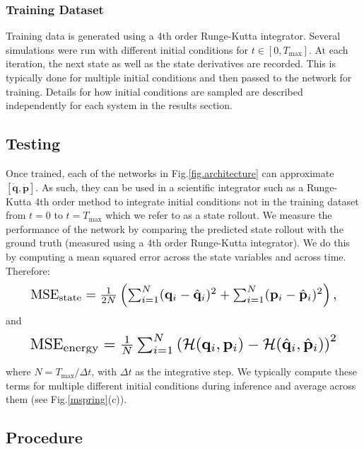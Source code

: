\documentclass{article}
\begin{document}
\subsubsection{Training Dataset}

Training data is generated using a 4th order Runge-Kutta integrator. Several simulations were run with different initial conditions for $t\in [0,T_{\max}]$. At each iteration, the next state as well as the state derivatives are recorded. This is typically done for multiple initial conditions and then passed to the network for training. Details for how initial conditions are sampled are described independently for each system in the results section.

\subsection{Testing}
Once trained, each of the networks in Fig.\ref{fig.architecture} can approximate $[\dot{\mathbf{q}},\dot{\mathbf{p}}]$. As such, they can be used in a scientific integrator such as a Runge-Kutta 4th order method to integrate initial conditions not in the training dataset from $t=0$ to $t=T_{\max}$ which we refer to as a state rollout. We measure the performance of the network by comparing the predicted state rollout with the ground truth (measured using a 4th order Runge-Kutta integrator). We do this by computing a mean squared error across the state variables and across time. Therefore:
\begin{equation}
\resizebox{0.9\linewidth}{!}{$%
\mathrm{MSE}_{\mathrm{state}} = \frac{1}{2N} \left(\sum_{i=1}^N (\mathbf{q}_i-\hat{\mathbf{q}}_i)^2 + \sum_{i=1}^N (\mathbf{p}_i - \hat{\mathbf{p}}_i)^2\right),$}%
\end{equation}
and
\begin{equation}
\resizebox{0.9\linewidth}{!}{$%
\mathrm{MSE}_{\mathrm{energy}} = \frac{1}{N} \sum_{i=1}^N \left(\mathcal{H}(\mathbf{q}_i,\mathbf{p}_i)-\mathcal{H}(\hat{\mathbf{q}}_i,\hat{\mathbf{p}}_i)\right)^2$}%
\end{equation}

where $N = T_{\max}/\Delta t $, with $\Delta t$ as the integrative step. We typically compute these terms for multiple different initial conditions during inference and average across them (see Fig.\ref{mspring}(c)).



\subsection{Procedure}
\end{document}
